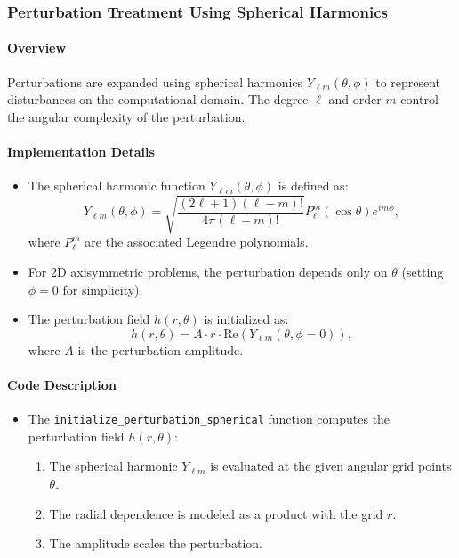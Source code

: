 \documentclass[12pt]{article}
\begin{document}
\subsubsection{Perturbation Treatment Using Spherical Harmonics}

\paragraph{Overview}
Perturbations are expanded using spherical harmonics $Y_{\ell m}(\theta, \phi)$ to represent disturbances on the computational domain. The degree $\ell$ and order $m$ control the angular complexity of the perturbation.

\paragraph{Implementation Details}
\begin{itemize}
    \item The spherical harmonic function $Y_{\ell m}(\theta, \phi)$ is defined as:
    \[
    Y_{\ell m}(\theta, \phi) = \sqrt{\frac{(2\ell + 1)(\ell - m)!}{4\pi (\ell + m)!}} P_\ell^m(\cos\theta) e^{i m \phi},
    \]
    where $P_\ell^m$ are the associated Legendre polynomials.
    \item For 2D axisymmetric problems, the perturbation depends only on $\theta$ (setting $\phi=0$ for simplicity).
    \item The perturbation field $h(r, \theta)$ is initialized as:
    \[
    h(r, \theta) = A \cdot r \cdot \text{Re}(Y_{\ell m}(\theta, \phi=0)),
    \]
    where $A$ is the perturbation amplitude.
\end{itemize}

\paragraph{Code Description}
\begin{itemize}
    \item The \texttt{initialize\_perturbation\_spherical} function computes the perturbation field $h(r, \theta)$:
    \begin{enumerate}
        \item The spherical harmonic $Y_{\ell m}$ is evaluated at the given angular grid points $\theta$.
        \item The radial dependence is modeled as a product with the grid $r$.
        \item The amplitude scales the perturbation.
    \end{enumerate}
\end{itemize}
\end{document}
